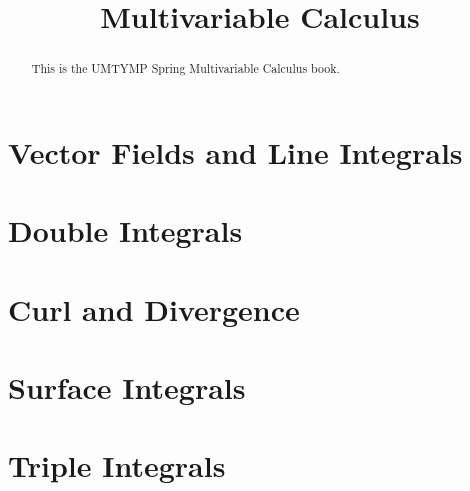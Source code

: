 \documentclass{xourse}
\title{Multivariable Calculus}
\begin{document}
\begin{abstract}
This is the UMTYMP Spring Multivariable Calculus book.
\end{abstract}
\maketitle


\part{Vector Fields and Line Integrals}


\part{Double Integrals}

\part{Curl and Divergence}

\part{Surface Integrals}

\part{Triple Integrals}
\end{document}
